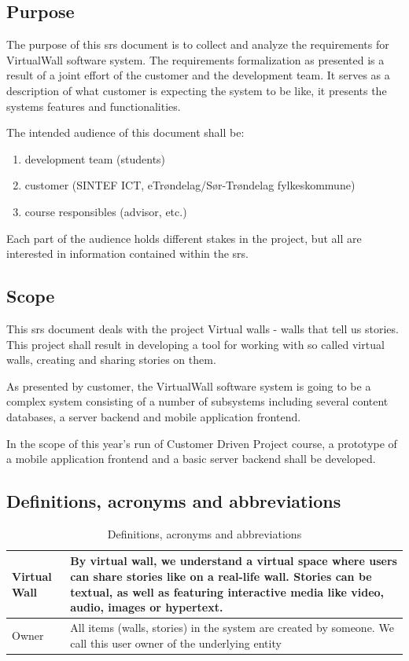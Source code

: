 \documentclass[11pt]{book}
\begin{document}
\subsection{Purpose}
The purpose of this \gls{srs} document is to collect and analyze the requirements for VirtualWall software system. The requirements formalization as presented is a result of a joint effort of the customer and the development team. It serves as a description of what customer is expecting the system to be like, it presents the systems features and functionalities.

The intended audience of this document shall be:

\begin{enumerate}
  \item development team (students)
  \item customer (SINTEF ICT, eTrøndelag/Sør-Trøndelag fylkeskommune)
  \item course responsibles (advisor, etc.)
\end{enumerate}

Each part of the audience holds different stakes in the project, but all are interested in information contained within the \gls{srs}.

\subsection{Scope}
This \gls{srs} document deals with the project Virtual walls - walls that tell us stories. This project shall result in developing a tool for working with so called virtual walls, creating and sharing stories on them.

As presented by customer, the VirtualWall software system is going to be a complex system consisting of a number of subsystems including several content databases, a server backend and mobile application frontend.

In the scope of this year's run of Customer Driven Project course, a prototype of a mobile application frontend and a basic server backend shall be developed.

\subsection{Definitions, acronyms and abbreviations}

\begin{table}[H]
\centering
\begin{tabular}{ l  p{11cm} }
    Virtual Wall     & By virtual wall, we understand a virtual space where users can share stories like on a real-life wall. 
                       Stories can be textual, as well as featuring interactive media like video, audio, images or hypertext.            \\ \hline
    Owner            & All items (walls, stories) in the system are created by someone. We call this user owner of the underlying entity \\
\end{tabular}
\caption{Definitions, acronyms and abbreviations}
\label{tab:req_definitions}
\end{table}
\end{document}
